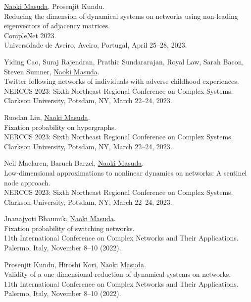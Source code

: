 \documentclass[11pt,letter]{article}
\begin{document}
\begin{etaremune}

\item \underline{Naoki Masuda}, Prosenjit Kundu.\\
Reducing the dimension of dynamical systems on networks using non-leading eigenvectors of adjacency matrices.\\
CompleNet 2023.\\
Universidade de Aveiro, Aveiro, Portugal, April 25--28, 2023.

\item Yiding Cao, Suraj Rajendran, Prathic Sundararajan, Royal Law, Sarah Bacon, Steven Sumner, \underline{Naoki Masuda}.\\
Twitter following networks of individuals with adverse childhood experiences.\\
NERCCS 2023: Sixth Northeast Regional Conference on Complex Systems.\\
Clarkson University, Potsdam, NY, March 22--24, 2023.

\item Ruodan Liu, \underline{Naoki Masuda}.\\
Fixation probability on hypergraphs.\\
NERCCS 2023: Sixth Northeast Regional Conference on Complex Systems.\\
Clarkson University, Potsdam, NY, March 22--24, 2023.

\item Neil Maclaren, Baruch Barzel, \underline{Naoki Masuda}.\\
Low-dimensional approximations to nonlinear dynamics on networks: A sentinel node approach.\\
NERCCS 2023: Sixth Northeast Regional Conference on Complex Systems.\\
Clarkson University, Potsdam, NY, March 22--24, 2023.

\item Jnanajyoti Bhaumik, \underline{Naoki Masuda}.\\
Fixation probability of switching networks.\\
11th International Conference on Complex Networks and Their Applications.\\
Palermo, Italy, November 8--10 (2022).

\item Prosenjit Kundu, Hiroshi Kori, \underline{Naoki Masuda}.\\
Validity of a one-dimensional reduction of dynamical systems on networks.\\
11th International Conference on Complex Networks and Their Applications.\\
Palermo, Italy, November 8--10 (2022).


\end{etaremune}
\end{document}
